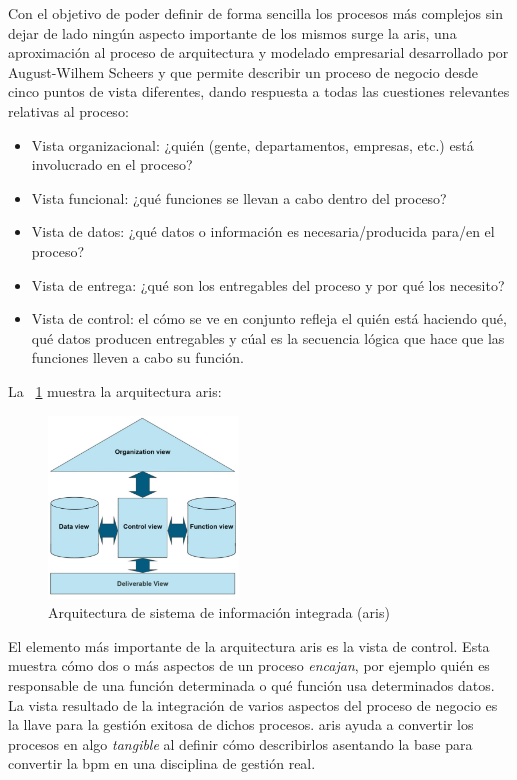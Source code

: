 Con el objetivo de poder definir de forma sencilla los procesos más complejos sin dejar de lado ningún aspecto importante de los mismos surge la \acrfull{aris}, una aproximación al proceso de arquitectura y modelado empresarial desarrollado por August-Wilhem Scheers y que permite describir un proceso de negocio desde cinco puntos de vista diferentes, dando respuesta a todas las cuestiones relevantes relativas al proceso:
\begin{itemize}
\item Vista organizacional: ¿quién (gente, departamentos, empresas, etc.) está involucrado en el proceso?
\item Vista funcional: ¿qué funciones se llevan a cabo dentro del proceso?
\item Vista de datos: ¿qué datos o información es necesaria/producida para/en el proceso?
\item Vista de entrega: ¿qué son los entregables del proceso y por qué los necesito?
\item Vista de control: el cómo se ve en conjunto refleja el quién está haciendo qué, qué datos producen entregables y cúal es la secuencia lógica que hace que las funciones lleven a cabo su función.
\end{itemize}


La \figurename~\ref{fig:aris} muestra la arquitectura \acrshort{aris}:

\begin{figure}[H]
  \centering
  \includegraphics[width=0.45\textwidth]{imaxes/aris.png}
  \caption{Arquitectura de sistema de información integrada (\acrshort{aris})}
  \label{fig:aris}
\end{figure}


El elemento más importante de la arquitectura \acrshort{aris} es la vista de control. Esta muestra cómo dos o más aspectos de un proceso \textit{encajan}, por ejemplo quién es responsable de una función determinada o qué función usa determinados datos. La vista resultado de la integración de varios aspectos del proceso de negocio es la llave para la gestión exitosa de dichos procesos. \acrshort{aris} ayuda a convertir los procesos en algo \textit{tangible} al definir cómo describirlos asentando la base para convertir la \acrfull{bpm} en una disciplina de gestión real.


